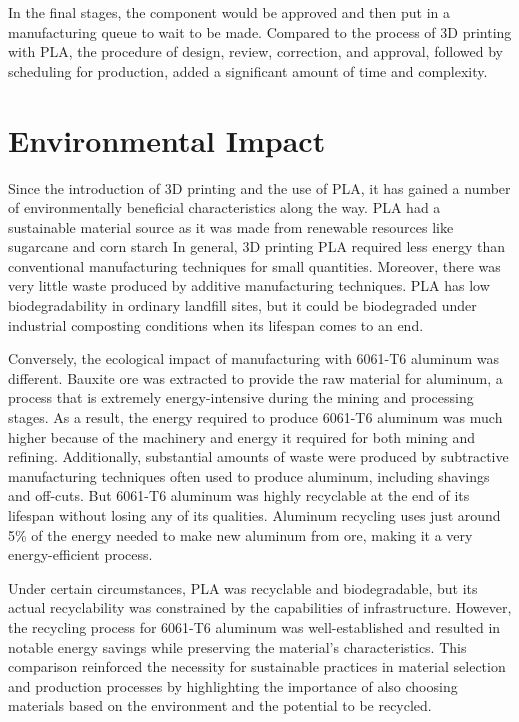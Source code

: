     In the final stages, the component would be approved and then put in a manufacturing queue to wait to
    be made. Compared to the process of 3D printing with PLA, the procedure of design, review, correction,
    and approval, followed by scheduling for production, added a significant amount of time and complexity.

\section{Environmental Impact}

    Since the introduction of 3D printing and the use of PLA, it has gained a number of environmentally
    beneficial characteristics along the way. PLA had a sustainable material source as it was made from
    renewable resources like sugarcane and corn starch In
    general, 3D printing PLA required less energy than conventional manufacturing techniques for small
    quantities. Moreover, there was very little waste produced by additive manufacturing techniques. PLA has
    low biodegradability in ordinary landfill sites, but it could be biodegraded under industrial composting
    conditions when its lifespan comes to an end\cite{pla_environmental_impact1}\cite{pla_environmental_impact2}.

    Conversely, the ecological impact of manufacturing with 6061-T6 aluminum was different. Bauxite ore
    was extracted to provide the raw material for aluminum, a process that is extremely energy-intensive
    during the mining and processing stages. As a result, the energy required to produce 6061-T6 aluminum
    was much higher because of the machinery and energy it required for both mining and refining.
    Additionally, substantial amounts of waste were produced by subtractive manufacturing techniques often
    used to produce aluminum, including shavings and off-cuts. But 6061-T6 aluminum was highly
    recyclable at the end of its lifespan without losing any of its qualities. Aluminum recycling uses just
    around 5\% of the energy needed to make new aluminum from ore, making it a very energy-efficient
    process\cite{aluminium_environmental_impact1}\cite{aluminium_environmental_impact2}.

    Under certain circumstances, PLA was recyclable and biodegradable, but its actual recyclability was
    constrained by the capabilities of infrastructure. However, the recycling process for 6061-T6 aluminum
    was well-established and resulted in notable energy savings while preserving the material's
    characteristics. This comparison reinforced the necessity for sustainable practices in material selection
    and production processes by highlighting the importance of also choosing materials based on the
    environment and the potential to be recycled.